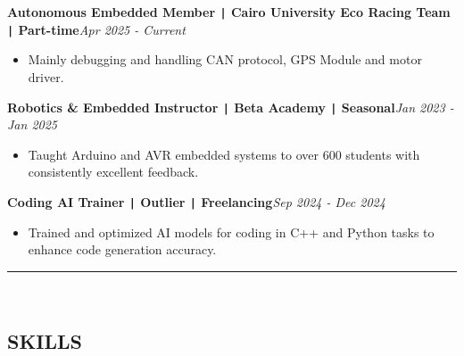 \documentclass[11pt,a4paper]{article}
\begin{document}
\begin{flushleft}
\textbf{Autonomous Embedded Member \texttt{|} Cairo University Eco Racing Team \texttt{|} Part-time}\hfill\textit{Apr 2025 - Current}\\
\end{flushleft}
\vspace{-0.6cm}
\begin{itemize}
\item \setlength{\itemsep}{-0.0em} Mainly debugging and handling CAN protocol, GPS Module and motor driver.
\end{itemize}
\vspace{-0.5cm}
\begin{flushleft}
\textbf{Robotics \& Embedded Instructor \texttt{|} Beta Academy \texttt{|} Seasonal}\hfill\textit{Jan 2023 - Jan 2025}\\
\end{flushleft}
\vspace{-0.6cm}
\begin{itemize}
\item \setlength{\itemsep}{-0.0em} Taught Arduino and AVR embedded systems to over 600 students with consistently excellent feedback.
\end{itemize}
\vspace{-0.5cm}
\begin{flushleft}
\textbf{Coding AI Trainer \texttt{|} Outlier \texttt{|} Freelancing}\hfill\textit{Sep 2024 - Dec 2024}\\
\end{flushleft}
\vspace{-0.6cm}
\begin{itemize}
\item \setlength{\itemsep}{-0.0em} Trained and optimized AI models for coding in C++ and Python tasks to enhance code generation accuracy.
\end{itemize}
\vspace{-0.5cm}
\vspace{0.2cm}
\rule{\textwidth}{0.3pt}\\
\vspace{-0.9cm}
\begin{center}
\section*{\fontsize{14}{18}\textbf\selectfont SKILLS}
\end{center}
\vspace{-0.4cm}
\renewcommand{\arraystretch}{1.8} %
\end{document}
